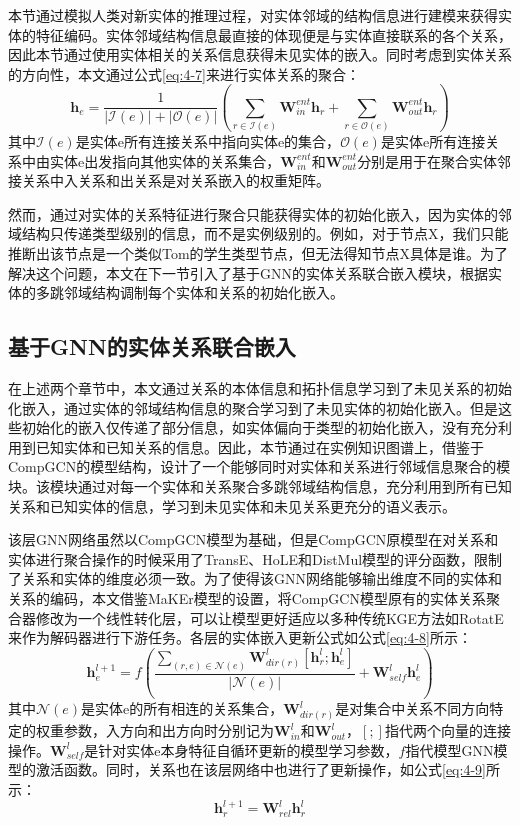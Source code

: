 本节通过模拟人类对新实体的推理过程，对实体邻域的结构信息进行建模来获得实体的特征编码。实体邻域结构信息最直接的体现便是与实体直接联系的各个关系，因此本节通过使用实体相关的关系信息获得未见实体的嵌入。同时考虑到实体关系的方向性，本文通过公式\ref{eq:4-7}来进行实体关系的聚合：
\begin{equation}
  \textbf{h}_{e} = \frac{1}{|\mathcal{I}(e)| + |\mathcal{O}(e)|} \left(
    \sum_{r\in \mathcal{I}(e)}\textbf{W}_{in}^{ent} \textbf{h}_{r} +
    \sum_{r\in \mathcal{O}(e)}\textbf{W}_{out}^{ent} \textbf{h}_{r}
    \right) \label{eq:4-7}
\end{equation}
其中\(\mathcal{I}(e)\)是实体e所有连接关系中指向实体e的集合，\(\mathcal{O}(e)\)是实体e所有连接关系中由实体e出发指向其他实体的关系集合，\(\textbf{W}_{in}^{ent}\)和\(\textbf{W}_{out}^{ent}\)分别是用于在聚合实体邻接关系中入关系和出关系是对关系嵌入的权重矩阵。

然而，通过对实体的关系特征进行聚合只能获得实体的初始化嵌入，因为实体的邻域结构只传递类型级别的信息，而不是实例级别的。例如，对于节点X，我们只能推断出该节点是一个类似Tom的学生类型节点，但无法得知节点X具体是谁。为了解决这个问题，本文在下一节引入了基于GNN的实体关系联合嵌入模块，根据实体的多跳邻域结构调制每个实体和关系的初始化嵌入。

\subsection{基于GNN的实体关系联合嵌入}
在上述两个章节中，本文通过关系的本体信息和拓扑信息学习到了未见关系的初始化嵌入，通过实体的邻域结构信息的聚合学习到了未见实体的初始化嵌入。但是这些初始化的嵌入仅传递了部分信息，如实体偏向于类型的初始化嵌入，没有充分利用到已知实体和已知关系的信息。因此，本节通过在实例知识图谱上，借鉴于CompGCN的模型结构，设计了一个能够同时对实体和关系进行邻域信息聚合的模块。该模块通过对每一个实体和关系聚合多跳邻域结构信息，充分利用到所有已知关系和已知实体的信息，学习到未见实体和未见关系更充分的语义表示。

该层GNN网络虽然以CompGCN模型为基础，但是CompGCN原模型在对关系和实体进行聚合操作的时候采用了TransE、HoLE和DistMul模型的评分函数，限制了关系和实体的维度必须一致。为了使得该GNN网络能够输出维度不同的实体和关系的编码，本文借鉴MaKEr\cite{chen2022meta}模型的设置，将CompGCN模型原有的实体关系聚合器修改为一个线性转化层，可以让模型更好适应以多种传统KGE方法如RotatE来作为解码器进行下游任务。各层的实体嵌入更新公式如公式\ref{eq:4-8}所示：
\begin{equation}
\textbf{h}_{e}^{l+1} = f \left(
\frac{\sum_{(r,e)\in \mathcal{N}(e)}\textbf{W}_{dir(r)}^{l} [\textbf{h}_{r}^{l} ; \textbf{h}_{e}^{l}]}{|\mathcal{N}(e)|} + \textbf{W}_{self}^{l}\textbf{h}_{e}^{l}
\right) \label{eq:4-8}
\end{equation}
其中\(\mathcal{N}(e)\)是实体e的所有相连的关系集合，\(\textbf{W}_{dir(r)}^{l}\)是对集合中关系不同方向特定的权重参数，入方向和出方向时分别记为\(\textbf{W}_{in}^{l}\)和\(\textbf{W}_{out}^{l}\)，\([;]\)指代两个向量的连接操作。\(\textbf{W}_{self}^{l}\)是针对实体e本身特征自循环更新的模型学习参数，\(f\)指代模型GNN模型的激活函数。同时，关系也在该层网络中也进行了更新操作，如公式\ref{eq:4-9}所示：
\begin{equation}
\textbf{h}_{r}^{l+1} = \textbf{W}_{rel}^{l}\textbf{h}_{r}^{l} \label{eq:4-9}
\end{equation}

